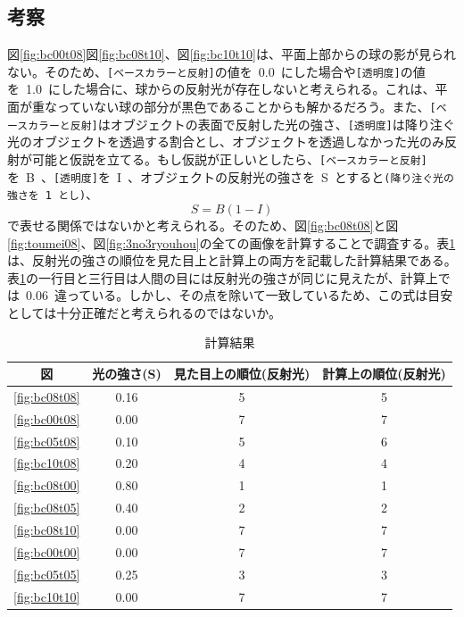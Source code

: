 \documentclass[a4j]{jarticle}
\begin{document}
\subsection{考察}
%
図\ref{fig:bc00t08}図\ref{fig:bc08t10}、図\ref{fig:bc10t10}は、平面上部からの球の影が見られない。そのため、\verb|[ベースカラーと反射]|の値を\ 0.0\ にした場合や\verb|[透明度]|の値を\ 1.0\ にした場合に、球からの反射光が存在しないと考えられる。これは、平面が重なっていない球の部分が黒色であることからも解かるだろう。また、\verb|[ベースカラーと反射]|はオブジェクトの表面で反射した光の強さ、\verb|[透明度]|は降り注ぐ光のオブジェクトを透過する割合とし、オブジェクトを透過しなかった光のみ反射が可能と仮説を立てる。もし仮説が正しいとしたら、\verb|[ベースカラーと反射]|を\ B\ 、\verb|[透明度]|を\ I\ 、オブジェクトの反射光の強さを\ S\ とすると\verb|(降り注ぐ光の強さを 1 とし)|、
\begin{equation*}
  S = B(1 - I)
\end{equation*}
で表せる関係ではないかと考えられる。そのため、図\ref{fig:bc08t08}と図\ref{fig:toumei08}、図\ref{fig:3no3ryouhou}の全ての画像を計算することで調査する。表\ref{table:keisan}は、反射光の強さの順位を見た目上と計算上の両方を記載した計算結果である。表\ref{table:keisan}の一行目と三行目は人間の目には反射光の強さが同じに見えたが、計算上では\ 0.06\ 違っている。しかし、その点を除いて一致しているため、この式は目安としては十分正確だと考えられるのではないか。
\begin{table}
  \caption{計算結果}
  \label{table:keisan}
  \centering
  \begin{tabular}{|c|c|c|c|}
  \hline
  図 & 光の強さ(S) & 見た目上の順位(反射光) & 計算上の順位(反射光)\\
  \hline
  \ref{fig:bc08t08} & 0.16 & 5 & 5 \\
  \ref{fig:bc00t08} & 0.00 & 7 & 7 \\
  \ref{fig:bc05t08} & 0.10 & 5 & 6 \\
  \ref{fig:bc10t08} & 0.20 & 4 & 4 \\
  \ref{fig:bc08t00} & 0.80 & 1 & 1 \\
  \ref{fig:bc08t05} & 0.40 & 2 & 2 \\
  \ref{fig:bc08t10} & 0.00 & 7 & 7 \\
  \ref{fig:bc00t00} & 0.00 & 7 & 7 \\
  \ref{fig:bc05t05} & 0.25 & 3 & 3 \\
  \ref{fig:bc10t10} & 0.00 & 7 & 7 \\
  \hline
  \end{tabular}
\end{table}
%
\end{document}
